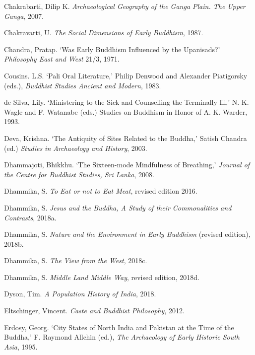 \label{footprints_split_022.html_Chakrabartiux202007}
Chakrabarti, Dilip K. \emph{Archaeological Geography of the Ganga Plain.
The Upper Ganga}, 2007.

Chakravarti, U. \emph{The Social Dimensions of Early Buddhism}, 1987.

Chandra, Pratap. `Was Early Buddhism Influenced by the Upanisads?'
\emph{Philosophy East and West} 21/3, 1971.

Cousins. L.S. `Pali Oral Literature,' Philip Denwood and Alexander
Piatigorsky (eds.), \emph{Buddhist Studies Ancient and Modern}, 1983.

\label{footprints_split_022.html_deux20Silvaux201993}
de Silva, Lily. `Ministering to the Sick and Counselling the Terminally
Ill,' N. K. Wagle and F. Watanabe (eds.) Studies on Buddhism in Honor of
A. K. Warder, 1993.

Deva, Krishna. `The Antiquity of Sites Related to the Buddha,' Satish
Chandra (ed.) \emph{Studies in Archaeology and History}, 2003.

\label{footprints_split_022.html_Dhammajotiux202008}
Dhammajoti, Bhikkhu. `The Sixteen-mode Mindfulness of Breathing,'
\emph{Journal of the Centre for Buddhist Studies, Sri Lanka}, 2008.

\label{footprints_split_022.html_Dhammikaux202016}
Dhammika, S. \emph{To Eat or not to Eat Meat}, revised edition 2016.

Dhammika, S. \emph{Jesus and the Buddha, A Study of their Commonalities
and Contrasts}, 2018a.

\label{footprints_split_022.html_Dhammikaux202018b}
Dhammika, S. \emph{Nature and the Environment in Early Buddhism}
(revised edition), 2018b.

\label{footprints_split_022.html_Dhammikaux202018c}
Dhammika, S. \emph{The View from the West}, 2018c.

\label{footprints_split_022.html_Dhammikaux202018d}
Dhammika, S. \emph{Middle Land Middle Way}, revised edition, 2018d.

\label{footprints_split_022.html_Dysonux202018}
Dyson, Tim. \emph{A Population History of India}, 2018.

Eltschinger, Vincent. \emph{Caste and Buddhist Philosophy}, 2012.

Erdosy, Georg. `City States of North India and Pakistan at the Time of
the Buddha,' F. Raymond Allchin (ed.), \emph{The Archaeology of Early
Historic South Asia}, 1995.

